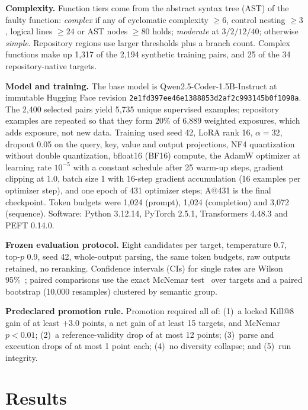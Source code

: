 \documentclass[10pt,conference,letterpaper]{IEEEtran}
\makeatletter
\newcommand{\killk}[1]{Kill@#1}
\makeatother
\begin{document}
\textbf{Complexity.} Function tiers come from the abstract syntax tree (AST) of the
faulty function: \emph{complex} if any of cyclomatic complexity $\geq 6$, control
nesting $\geq 3$, logical lines $\geq 24$ or AST nodes $\geq 80$ holds;
\emph{moderate} at $3/2/12/40$; otherwise \emph{simple}. Repository regions use larger
thresholds plus a branch count. Complex functions make up 1,317 of the 2,194 synthetic
training pairs, and 25 of the 34 repository-native targets.

\textbf{Model and training.} The base model is Qwen2.5-Coder-1.5B-Instruct at
immutable Hugging Face revision
\texttt{2e1fd397ee46e1388853d2af2c993145b0f1098a}. The 2,400 selected pairs yield
5,735 unique supervised examples; repository examples are repeated so that they form
20\% of 6,889 weighted exposures, which adds exposure, not new data. Training used
seed 42, LoRA rank 16, $\alpha=32$, dropout 0.05 on the query, key, value and output
projections, NF4 quantization without double quantization, bfloat16 (BF16) compute,
the AdamW optimizer at learning rate $10^{-5}$ with a constant schedule after 25
warm-up steps, gradient clipping at 1.0, batch size 1 with 16-step gradient
accumulation (16 examples per optimizer step), and one epoch of 431 optimizer steps;
A@431 is the final checkpoint. Token budgets were 1,024 (prompt), 1,024 (completion)
and 3,072 (sequence). Software: Python 3.12.14, PyTorch 2.5.1, Transformers 4.48.3 and
PEFT 0.14.0.

\textbf{Frozen evaluation protocol.} Eight candidates per target, temperature 0.7,
top-$p$ 0.9, seed 42, whole-output parsing, the same token budgets, raw outputs
retained, no reranking. Confidence intervals (CIs) for single rates are Wilson
95\%~\cite{wilson1927probable}; paired comparisons use the exact McNemar
test~\cite{mcnemar1947note} over targets and a paired bootstrap (10,000 resamples)
clustered by semantic group.

\textbf{Predeclared promotion rule.} Promotion required all of: (1)~a locked
\killk{8} gain of at least $+3.0$ points, a net gain of at least 15 targets, and
McNemar $p<0.01$; (2)~a reference-validity drop of at most 12 points; (3)~parse and
execution drops of at most 1 point each; (4)~no diversity collapse; and (5)~run
integrity.

\section{Results}
\label{sec:results}
\end{document}
